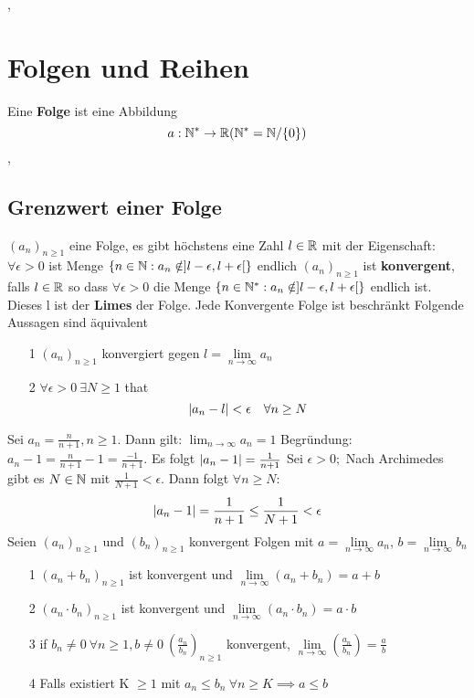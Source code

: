 \sep
\section{Folgen und Reihen}
\Def[2.1] Eine \textbf{Folge} ist eine Abbildung 
\[a: \mathbb{N}^* \rightarrow \mathbb{R} (\mathbb{N}^* = \mathbb{N} / \{0\})\]
\sep
\subsection{Grenzwert einer Folge}
\Lemma[2.3]\((a_n)_{n\geq1}\) eine Folge, es gibt höchstens eine Zahl \(l \in \mathbb{R}\) mit der Eigenschaft: \newline
\(\forall \epsilon > 0\) ist Menge \(\{n \in \mathbb{N} : a_n \notin ]l-\epsilon, l+\epsilon [\}\) endlich \newline
\Def[2.4] \((a_n)_{n\geq1}\) ist \textbf{konvergent}, falls \(l \in \mathbb{R}\) so dass \(\forall \epsilon > 0\)
die Menge \(\{n \in \mathbb{N}^* : a_n \notin ]l-\epsilon, l+\epsilon [\}\) endlich ist. Dieses l ist der \textbf{Limes} der Folge. \newline
\Bem[2.5] Jede Konvergente Folge ist beschränkt
\Lemma[2.6] Folgende Aussagen sind äquivalent
\begin{enumerate}
    \item [1]  \((a_n)_{n\geq1}\) konvergiert gegen \(l = \lim\limits_{n \rightarrow \infty} a_n\)
    \item [2] \(\forall \epsilon > 0 \ \exists N \geq 1\) that
    \[ \left\lvert a_n - l \right\rvert < \epsilon \quad \forall n \geq N \]
\end{enumerate}
\Bsp[2.7] Sei \( a_n = \frac{n}{n+1}, n \geq 1\). \newline Dann gilt: \( \lim_{n \rightarrow \infty} a_n = 1\) \newline
Begründung: \( a_n -1 = \frac{n}{n+1}-1 = \frac{-1}{n+1 }\). Es folgt \( \left\lvert a_n -1 \right\rvert = \frac{1}{n+1}\)
Sei \(  \epsilon > 0;\) Nach Archimedes gibt es \( N \in \mathbb{N} \) mit \( \frac{1}{N+1} < \epsilon \). \newline
Dann folgt \( \forall n \geq N\):
\[ \left\lvert a_n-1 \right\rvert = \frac{1}{n+1} \leq \frac{1}{N+1} < \epsilon \]
\Satz[2.8] Seien \((a_n)_{n \geq 1}\) und \((b_n)_{n \geq 1}\) konvergent Folgen mit \(a= \lim\limits_{n \rightarrow \infty} a_n\), $b = \lim\limits_{n \rightarrow \infty} b_n$
\begin{enumerate} 
    \item [1] \((a_n + b_n)_{n \geq 1}\) ist konvergent und \newline \(\lim\limits_{n \rightarrow \infty} (a_n + b_n) = a+b\)
    \item [2] \((a_n \cdot b_n)_{n \geq 1}\) ist konvergent und \newline \(\lim\limits_{n \rightarrow \infty} (a_n \cdot b_n) = a \cdot b\)
    \item [3] if \(b_n \neq 0 \ \forall n \geq 1, b \neq 0 \ (\frac{a_n}{b_n})_{n\geq 1}\) konvergent, \(\lim\limits_{n \rightarrow \infty} (\frac{a_n}{b_n}) = \frac{a}{b}\)
    \item [4] Falls existiert K \(\geq 1\) mit \(a_n \leq b_n \ \forall n \geq K \implies a \leq b\)
\end{enumerate}

